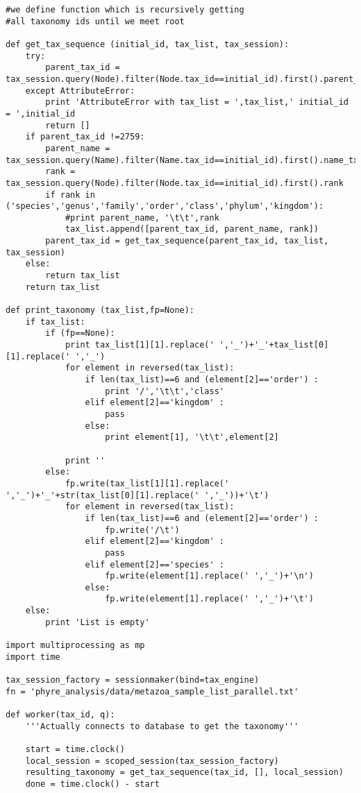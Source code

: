 \documentclass[a4paper,11pt]{article}
\begin{document}
\begin{lstlisting}
#we define function which is recursively getting 
#all taxonomy ids until we meet root

def get_tax_sequence (initial_id, tax_list, tax_session):
    try:
        parent_tax_id = tax_session.query(Node).filter(Node.tax_id==initial_id).first().parent_tax_id
    except AttributeError:
        print 'AttributeError with tax_list = ',tax_list,' initial_id = ',initial_id
        return []
    if parent_tax_id !=2759:
        parent_name = tax_session.query(Name).filter(Name.tax_id==initial_id).first().name_txt
        rank = tax_session.query(Node).filter(Node.tax_id==initial_id).first().rank
        if rank in ('species','genus','family','order','class','phylum','kingdom'):
            #print parent_name, '\t\t',rank
            tax_list.append([parent_tax_id, parent_name, rank])
        parent_tax_id = get_tax_sequence(parent_tax_id, tax_list, tax_session)
    else: 
        return tax_list
    return tax_list

def print_taxonomy (tax_list,fp=None):
    if tax_list:
        if (fp==None):
            print tax_list[1][1].replace(' ','_')+'_'+tax_list[0][1].replace(' ','_')
            for element in reversed(tax_list):
                if len(tax_list)==6 and (element[2]=='order') :
                    print '/','\t\t','class'
                elif element[2]=='kingdom' :
                    pass
                else:
                    print element[1], '\t\t',element[2]
            
            print ''
        else:
            fp.write(tax_list[1][1].replace(' ','_')+'_'+str(tax_list[0][1].replace(' ','_'))+'\t')
            for element in reversed(tax_list):
                if len(tax_list)==6 and (element[2]=='order') :
                    fp.write('/\t')
                elif element[2]=='kingdom' :
                    pass
                elif element[2]=='species' :
                    fp.write(element[1].replace(' ','_')+'\n')
                else:
                    fp.write(element[1].replace(' ','_')+'\t')
    else:
        print 'List is empty'

import multiprocessing as mp
import time

tax_session_factory = sessionmaker(bind=tax_engine)
fn = 'phyre_analysis/data/metazoa_sample_list_parallel.txt'

def worker(tax_id, q):
    '''Actually connects to database to get the taxonomy'''
    
    start = time.clock()
    local_session = scoped_session(tax_session_factory)
    resulting_taxonomy = get_tax_sequence(tax_id, [], local_session)
    done = time.clock() - start
    

\end{lstlisting}
\end{document}
